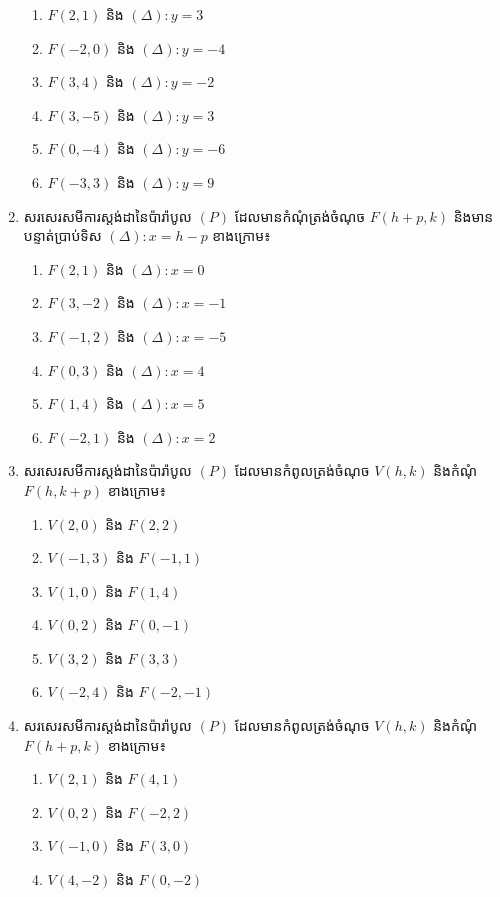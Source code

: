 \begin{enumerate}
	\begin{enumerate}[2]
		\item $ F(2,1) $ និង $ (\Delta):y=3 $
		\item $ F(-2,0) $ និង $ (\Delta):y=-4 $
		\item $ F(3,4) $ និង $ (\Delta):y=-2 $
		\item $ F(3,-5) $ និង $ (\Delta):y=3 $
		\item $ F(0,-4) $ និង $ (\Delta):y=-6 $
		\item $ F(-3,3) $ និង $ (\Delta):y=9 $
	\end{enumerate}
	\item សរសេរសមីការស្តង់ដានៃប៉ារ៉ាបូល $ (P) $ ដែលមានកំណុំត្រង់ចំណុច $ F(h+p,k) $ និងមានបន្ទាត់ប្រាប់ទិស $ (\Delta):x=h-p $ ខាងក្រោម៖
	\begin{enumerate}[2]
		\item $ F(2,1) $ និង $ (\Delta):x=0 $
		\item $ F(3,-2) $ និង $ (\Delta):x=-1 $
		\item $ F(-1,2) $ និង $ (\Delta):x=-5 $
		\item $ F(0,3) $ និង $ (\Delta):x=4 $
		\item $ F(1,4) $ និង $ (\Delta):x=5 $
		\item $ F(-2,1) $ និង $ (\Delta):x=2 $
	\end{enumerate}
	\item សរសេរសមីការស្តង់ដានៃប៉ារ៉ាបូល $ (P) $ ដែលមានកំពូលត្រង់ចំណុច $ V(h,k) $ និងកំណុំ $ F(h,k+p) $ ខាងក្រោម៖
	\begin{enumerate}[2]
		\item $ V(2,0) $ និង $ F(2,2) $
		\item $ V(-1,3) $ និង $ F(-1,1) $
		\item $ V(1,0) $ និង $ F(1,4) $
		\item $ V(0,2) $ និង $ F(0,-1) $
		\item $ V(3,2) $ និង $ F(3,3) $
		\item $ V(-2,4) $ និង $ F(-2,-1) $
	\end{enumerate}
	\item សរសេរសមីការស្តង់ដានៃប៉ារ៉ាបូល $ (P) $ ដែលមានកំពូលត្រង់ចំណុច $ V(h,k) $ និងកំណុំ $ F(h+p,k) $ ខាងក្រោម៖
	\begin{enumerate}[2]
		\item $ V(2,1) $ និង $ F(4,1) $
		\item $ V(0,2) $ និង $ F(-2,2) $
		\item $ V(-1,0) $ និង $ F(3,0) $
		\item $ V(4,-2) $ និង $ F(0,-2) $

\end{enumerate}
\end{enumerate}
